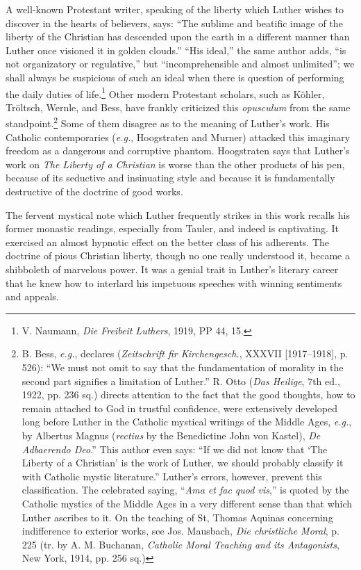 A well-known Protestant writer, speaking of the liberty which
Luther wishes to discover in the hearts of believers, says: “The sublime
and beatific image of the liberty of the Christian has descended
upon the earth in a different manner than Luther once visioned it in
golden clouds.” “His ideal,” the same author adds, “is not organizatory
or regulative,” but “incomprehensible and almost unlimited”;
we shall always be suspicious of such an ideal when there is question of
performing the daily duties of life.\footnote
{V. Naumann, \textit{Die Freibeit Luthers}, 1919, PP 44, 15.}
Other modern Protestant
scholars, such as Köhler, Tröltsch, Wernle, and Bess, have frankly
criticized this \textit{opusculum} from the same standpoint.\footnote
{B. Bess, \textit{e.g.}, declares (\textit{Zeitschrift fir Kirchengesch.}, XXXVII [1917--1918], p. 526):
“We must not omit to say that the fundamentation of morality in the second part signifies
a limitation of Luther.” R. Otto (\textit{Das Heilige}, 7th ed., 1922, pp. 236 sq.) directs
attention to the fact that the good thoughts, how to remain attached to God in trustful
confidence, were extensively developed long before Luther in the Catholic mystical writings
of the Middle Ages, \textit{e.g.}, by Albertus Magnus (\textit{rectius} by the Benedictine John von Kastel),
\textit{De Adbaerendo Deo}.” This author even says: “If we did not know that ‘The Liberty of a
Christian’ is the work of Luther, we should probably classify it with Catholic mystic
literature.” Luther’s errors, however, prevent this classification. The celebrated saying,
“\textit{Ama et fac quod vis},” is quoted by the Catholic mystics of the Middle Ages in a very
different sense than that which Luther ascribes to it. On the teaching of St, Thomas
Aquinas concerning indifference to exterior works, see Jos. Mausbach, \textit{Die christliche Moral},
p. 225 (tr. by A. M. Buchanan, \textit{Catholic Moral Teaching and its Antagonists}, New York,
1914, pp. 256 sq.)}
Some of them disagree as to the meaning of Luther’s work. His Catholic contemporaries
(\textit{e.g.}, Hoogstraten and Murner) attacked this imaginary
freedom as a dangerous and corruptive phantom. Hoogstraten says
that Luther’s work on \textit{The Liberty of a Christian} is worse than the
other products of his pen, because of its seductive and insinuating
style and because it is fundamentally destructive of the doctrine of
good works.

The fervent mystical note which Luther frequently strikes in this
work recalls his former monastic readings, especially from Tauler,
and indeed is captivating. It exercised an almost hypnotic effect on
the better class of his adherents. The doctrine of pious Christian liberty,
though no one really understood it, became a shibboleth of marvelous
power. It was a genial trait in Luther’s literary career that he
knew how to interlard his impetuous speeches with winning sentiments
and appeals.

